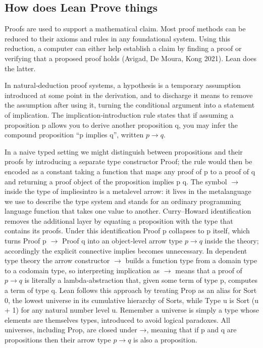 \documentclass{article}
\newcommand{\1}{\mathbbm{1}}
\theoremstyle{plain}
\theoremstyle{definition}
\numberwithin{equation}{section}
\begin{document}
\subsection{How does Lean Prove things}

Proofs are used to support a mathematical claim. Most proof methods can be reduced to their axioms and rules in any foundational system. Using this reduction, a computer can either help establish a claim by finding a proof or verifying that a proposed proof holds (Avigad, De Moura,  Kong 2021). Lean does the latter. 

In natural‑deduction proof systems, a hypothesis is a temporary assumption introduced at some point in the derivation, and to discharge it means to remove the assumption after using it, turning the conditional argument into a statement of implication. The implication‑introduction rule states that if assuming a proposition p allows you to derive another proposition q, you may infer the compound proposition “p implies q”, written $p\rightarrow q$. 

In a naive typed setting we might distinguish between propositions and their proofs by introducing a separate type constructor Proof; the rule would then be encoded as a constant taking a function that maps any proof of p to a proof of q and returning a proof object of the proposition implies p q. The symbol $\rightarrow$ inside the type of impliesintro is a metalevel arrow: it lives in the metalanguage we use to describe the type system and stands for an ordinary programming language function that takes one value to another. Curry–Howard identification removes the additional layer by equating a proposition with the type that contains its proofs. Under this identification Proof p collapses to p itself, which turns Proof p $\rightarrow$ Proof q into an object‑level arrow type $p\rightarrow q$ inside the theory; accordingly the explicit connective implies becomes unnecessary. In dependent type theory the arrow constructor $\rightarrow$ builds a function type from a domain type to a codomain type, so interpreting implication as $\rightarrow$ means that a proof of $p→q$ is literally a lambda‑abstraction that, given some term of type p, computes a term of type q. Lean follows this approach by treating Prop as an alias for Sort 0, the lowest universe in its cumulative hierarchy of Sorts, while Type u is Sort (u + 1) for any natural number level u. Remember a universe is simply a type whose elements are themselves types, introduced to avoid logical paradoxes. All universes, including Prop, are closed under →, meaning that if p and q are propositions then their arrow type $p→q$ is also a proposition. 
\end{document}

